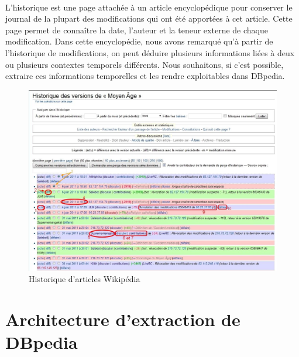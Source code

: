 \documentclass[12pt,a4	]{report}
\begin{document}
\paragraph{}
L'historique est une page attachée à un article encyclopédique pour conserver le journal de la plupart des modifications qui ont été apportées à cet article. Cette page permet de connaître la date, l'auteur et la teneur externe de chaque modification.
Dans cette encyclopédie, nous avons remarqué qu'à partir de l'historique de modifications, on peut déduire plusieurs informations liées à deux ou plusieurs contextes temporels différents.
Nous souhaitons, si c’est possible, extraire ces informations temporelles et les rendre exploitables dans DBpedia.
\begin{figure}[H]
\centering
\includegraphics[width=13cm]{Historique_articles.jpg}
\caption{Historique d'articles Wikipédia}
\end{figure}
\newpage

\section{Architecture d'extraction de DBpedia}
\end{document}
